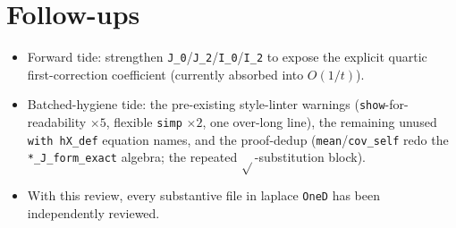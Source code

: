 \documentclass[11pt]{article}
\begin{document}
\section{Follow-ups}
\begin{itemize}[noitemsep]
  \item Forward tide: strengthen \texttt{J\_0}/\texttt{J\_2}/\texttt{I\_0}/\texttt{I\_2} to expose the
    explicit quartic first-correction coefficient (currently absorbed into $O(1/t)$).
  \item Batched-hygiene tide: the pre-existing style-linter warnings (\texttt{show}-for-readability
    $\times5$, flexible \texttt{simp} $\times2$, one over-long line), the remaining unused
    \texttt{with hX\_def} equation names, and the proof-dedup (\texttt{mean}/\texttt{cov\_self} redo
    the \texttt{*\_J\_form\_exact} algebra; the repeated $\sqrt{}$-substitution block).
  \item With this review, every substantive file in laplace \texttt{OneD} has been independently
    reviewed.
\end{itemize}
\end{document}
